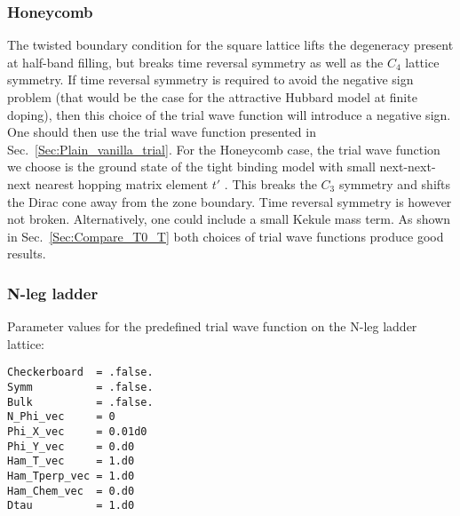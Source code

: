 \subsubsection{Honeycomb}

The twisted boundary condition  for the square lattice lifts  the degeneracy  present at half-band filling, but breaks time reversal symmetry as well as the $C_4$ lattice symmetry.  If  time reversal  symmetry is  required  to avoid the negative sign problem (that would be the case for the attractive Hubbard model at finite doping), then this choice of the trial  wave function will introduce a negative sign. One should then use the trial wave function presented in Sec.~\ref{Sec:Plain_vanilla_trial}.  For the Honeycomb case,  the trial wave function we choose is the ground state of the tight binding model  with small  next-next-next  nearest hopping matrix element $t'$  \cite{Ixert14}.
This breaks the $C_3$ symmetry and shifts the Dirac cone away from the zone boundary.
Time  reversal symmetry is however not broken.
Alternatively, one could include a small Kekule mass term.
As shown in Sec.~\ref{Sec:Compare_T0_T} both choices of trial wave functions produce good results.



\subsubsection{N-leg ladder}

Parameter values for the predefined trial wave function on the N-leg ladder lattice:
\begin{lstlisting}[style=fortran]
Checkerboard  = .false.
Symm          = .false.
Bulk          = .false.
N_Phi_vec     = 0
Phi_X_vec     = 0.01d0
Phi_Y_vec     = 0.d0
Ham_T_vec     = 1.d0
Ham_Tperp_vec = 1.d0
Ham_Chem_vec  = 0.d0
Dtau          = 1.d0
\end{lstlisting}


